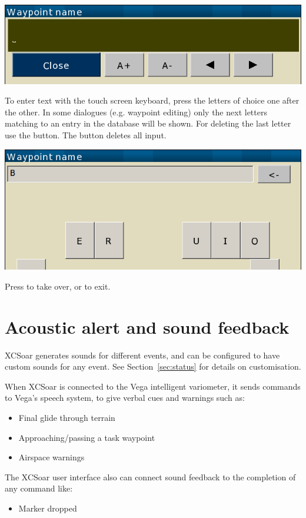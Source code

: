 \begin{center}
\includegraphics[angle=0,width=0.6\linewidth,keepaspectratio='true']{figures/textentry.png}
\end{center}

To enter text with the touch screen keyboard, press the letters of choice one after the other. 
In some dialogues (e.g. waypoint editing) only the next letters matching to an entry in the database 
will be shown. For deleting the last letter use the \button{$<-$} button. The
 button deletes all input.

\begin{center}
\includegraphics[angle=0,width=0.6\linewidth,keepaspectratio='true']{figures/textentry_keyboard.png}
\end{center}

Press  to take over, or  to exit.

\section{Acoustic alert and sound feedback}

XCSoar generates sounds for different events, and can be configured to
have custom sounds for any event.  See Section~\ref{sec:status} for
details on customisation.

When XCSoar is connected to the Vega intelligent variometer, it sends
commands to Vega's speech system, to give verbal cues and warnings such as:
\begin{itemize}
\item Final glide through terrain
\item Approaching/passing a task waypoint
\item Airspace warnings
\end{itemize}

The XCSoar user interface also can connect sound feedback to the completion of any command like:
\begin{itemize}
\item Marker dropped
\end{itemize}

